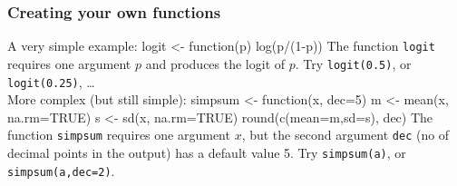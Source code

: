 \documentclass[xcolor=svgnames,handout]{beamer}
\newcommand{\code}[1]{\texttt{#1}}
\let\overbatim\verbatim
\let\endoverbatim\endverbatim
\newenvironment{vcode}%
{\bgroup\baselineskip=0.8\baselineskip\overbatim}%
{\endoverbatim\egroup}
\newcounter{demo}
\newcommand{\Demo}{\stepcounter{demo}\frametitle{Demo \arabic{demo}}}
\begin{document}
\begin{frame}[fragile]
\frametitle{Creating your own functions}
A very simple example: 
\begin{vcode}
logit <- function(p)  log(p/(1-p))
\end{vcode}
The function \code{logit} requires one argument $p$ and produces the logit of $p$. Try  
\code{logit(0.5)}, or \code{logit(0.25)}, \ldots \\[0.3cm]
More complex (but still simple):
\begin{vcode}
simpsum <- function(x, dec=5) {
m <- mean(x, na.rm=TRUE)
s  <- sd(x, na.rm=TRUE)
 round(c(mean=m,sd=s), dec) } 
\end{vcode}
The function \code{simpsum} requires one argument $x$, but the second argument \code{dec} (no of decimal points in the output) has a default value 5. Try \code{simpsum(a)}, or \code{simpsum(a,dec=2)}.
\end{frame}
\end{document}
